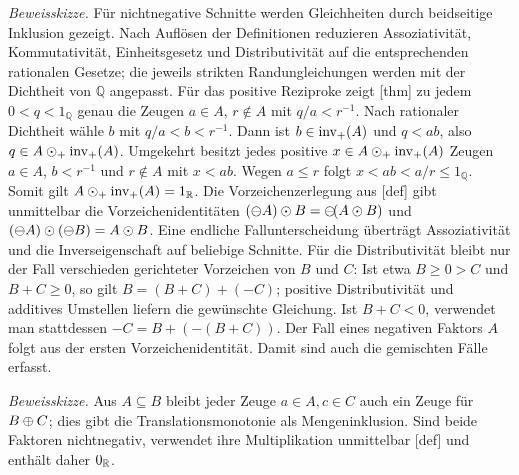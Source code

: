 \documentclass[main.tex]{subfiles}
\begin{document}
\emph{Beweisskizze.}
Für nichtnegative Schnitte werden Gleichheiten durch beidseitige Inklusion
gezeigt. Nach Auflösen der Definitionen reduzieren Assoziativität,
Kommutativität, Einheitsgesetz und Distributivität auf die entsprechenden
rationalen Gesetze; die jeweils strikten Randungleichungen werden mit der
Dichtheit von \(\mathbb Q\) angepasst. Für das positive Reziproke zeigt
[thm] zu jedem
\(0<q<1_{\mathbb Q}\) genau die Zeugen \(a\in A\), \(r\notin A\) mit
\(q/a<r^{-1}\). Nach rationaler Dichtheit wähle
\(b\) mit \(q/a<b<r^{-1}\). Dann ist
\(b\in\operatorname{inv}_{+}\!\left(A\right)\) und \(q<ab\), also
\(q\in A\mathbin{\odot_{+}}\operatorname{inv}_{+}\!\left(A\right)\). Umgekehrt besitzt jedes positive
\(x\in A\mathbin{\odot_{+}}\operatorname{inv}_{+}\!\left(A\right)\) Zeugen \(a\in A\),
\(b<r^{-1}\) und \(r\notin A\) mit \(x<ab\). Wegen \(a\leq r\) folgt
\(x<ab<a/r\leq1_{\mathbb Q}\). Somit gilt
\(A\mathbin{\odot_{+}}\operatorname{inv}_{+}\!\left(A\right)=1_{\mathbb R}\).
Die Vorzeichenzerlegung aus
[def] gibt unmittelbar die
Vorzeichenidentitäten
\((\mathop{\ominus}\!A)\mathbin{\odot} B=\mathop{\ominus}\!(A\mathbin{\odot} B)\) und
\((\mathop{\ominus}\!A)\mathbin{\odot}(\mathop{\ominus}\!B)=A\mathbin{\odot} B\). Eine endliche
Fallunterscheidung überträgt Assoziativität und die Inverseigenschaft auf
beliebige Schnitte. Für die Distributivität bleibt nur der Fall verschieden
gerichteter Vorzeichen von \(B\) und \(C\): Ist etwa
\(B\geq0>C\) und \(B+C\geq0\), so gilt
\(B=(B+C)+(-C)\); positive Distributivität und additives Umstellen liefern
die gewünschte Gleichung. Ist \(B+C<0\), verwendet man stattdessen
\(-C=B+(-(B+C))\). Der Fall eines negativen Faktors \(A\) folgt aus der
ersten Vorzeichenidentität. Damit sind auch die gemischten Fälle erfasst.


\emph{Beweisskizze.}
Aus \(A\subseteq B\) bleibt jeder Zeuge \(a\in A,c\in C\) auch ein Zeuge für
\(B\mathbin{\oplus} C\); dies gibt die Translationsmonotonie als Mengeninklusion. Sind
beide Faktoren nichtnegativ, verwendet ihre Multiplikation unmittelbar
[def] und enthält daher
\(0_{\mathbb R}\).
\end{document}

